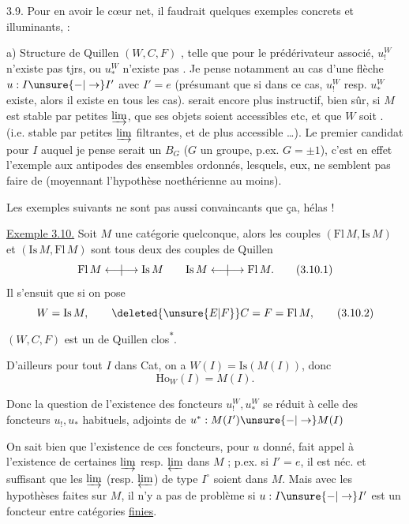 3.9. Pour en avoir le cœur net, il faudrait
quelques exemples concrets et illuminants,  :

a) Structure de Quillen  $(W,C,F)$ , telle que pour
le prédérivateur associé, $u^{W}_{!}$ n'existe pas tjrs,
ou $u^{W}_{*}$ n'existe pas . Je pense
notamment au cas d'une flèche $u:I\unsure{-|\to}I'$
avec $I'=e$ (présumant que si dans ce cas,
$u^{W}_{!}$ resp. $u^{W}_{*}$ existe, alors il existe en tous les
cas).    serait encore plus
instructif, bien sûr, si $M$ est stable par petites
$\varinjlim$, que ses objets soient accessibles etc, et
que $W$ soit . (i.e. stable par
petites $\varinjlim$ filtrantes, et de plus accessible
\ldots). Le premier candidat pour $I$ auquel
je pense serait un $B_G$ ($G$ un groupe, p.ex.
$G=\pm1$), c'est en effet l'exemple aux antipodes
des ensembles ordonnés, lesquels, eux, ne
semblent pas faire  de  (moyennant
l'hypothèse noethérienne  au moins).

Les exemples suivants ne  sont pas
aussi convaincants que ça, hélas !

\uline{Exemple 3.10.} Soit $M$ une catégorie
quelconque, alors les couples $(\mathrm{Fl}\,M,\mathrm{Is}\,M)$
et $(\mathrm{Is}\,M,\mathrm{Fl}\,M)$ sont tous deux des
couples de Quillen
\[
 \mathrm{Fl}\,M\mathrel{\longleftarrow\mkern-9mu|\mkern-9mu\longrightarrow}\mathrm{Is}\,M
 \qquad \mathrm{Is}\,M\mathrel{\longleftarrow\mkern-9mu|\mkern-9mu\longrightarrow}\mathrm{Fl}\,M.\tag*{(3.10.1)}
\]
Il s'ensuit que si on pose
\[
 W=\mathrm{Is}\,M,\qquad \deleted{\unsure{E|F}}C=F=\mathrm{Fl}\,M,\tag*{(3.10.2)}
\]
$(W,C,F)$ est un  de Quillen clos\textsuperscript{$*$}.
{\reversemarginpar{}}

D'ailleurs pour tout $I$ dans Cat, on a
$W(I)=\mathrm{Is}(M(I))$, donc \unsure{!}
\[
 \mathrm{Ho}_W(I)=M(I).\tag*{(3.10.3)}
\]

Donc la question de l'existence des foncteurs
$u^W_!,u^W_*$ se réduit à celle des foncteurs
$u_!,u_*$ habituels, adjoints  de $u^*:M(I')\unsure{-|\to}M(I)$

On sait bien que l'existence de ces foncteurs,
pour $u$ donné, fait appel à l'existence de
certaines $\varinjlim$ resp. $\varprojlim$ dans $M$ ; p.ex. si
$I'=e$, il est néc. et suffisant que les $\varinjlim$
(resp. $\varprojlim$) de type $I^\circ$ soient  dans $M$.
Mais avec les hypothèses faites sur $M$, il
n'y a pas de problème si $u:I\unsure{-|\to}I'$ est
un foncteur entre catégories \uline{finies}.

